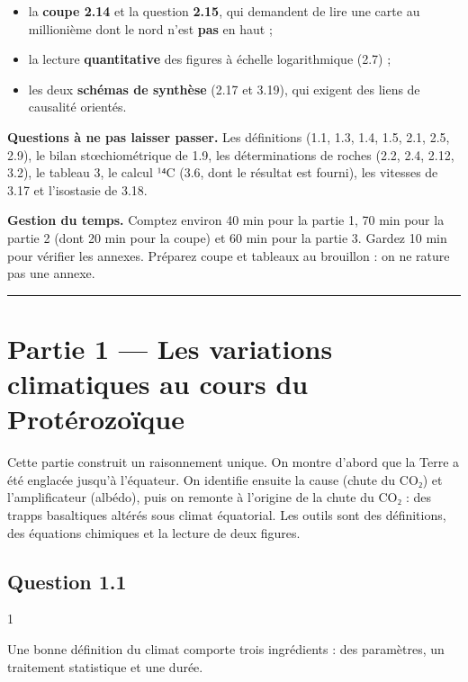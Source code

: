 \documentclass[11pt,a4paper]{article}
\providecommand{\tightlist}{\setlength{\itemsep}{0pt}\setlength{\parskip}{0pt}}
\begin{document}
\begin{itemize}
\tightlist
\item
  la \textbf{coupe 2.14} et la question \textbf{2.15}, qui demandent de lire une carte au millionième dont le nord n'est \textbf{pas} en haut ;
\item
  la lecture \textbf{quantitative} des figures à échelle logarithmique (2.7) ;
\item
  les deux \textbf{schémas de synthèse} (2.17 et 3.19), qui exigent des liens de causalité orientés.
\end{itemize}

\textbf{Questions à ne pas laisser passer.} Les définitions (1.1, 1.3, 1.4, 1.5, 2.1, 2.5, 2.9), le bilan stœchiométrique de 1.9, les déterminations de roches (2.2, 2.4, 2.12, 3.2), le tableau 3, le calcul ¹⁴C (3.6, dont le résultat est fourni), les vitesses de 3.17 et l'isostasie de 3.18.

\textbf{Gestion du temps.} Comptez environ 40 min pour la partie 1, 70 min pour la partie 2 (dont 20 min pour la coupe) et 60 min pour la partie 3. Gardez 10 min pour vérifier les annexes. Préparez coupe et tableaux au brouillon : on ne rature pas une annexe.

\begin{center}\rule{0.5\linewidth}{0.5pt}\end{center}

\hypertarget{partie-1-les-variations-climatiques-au-cours-du-protuxe9rozouxefque}{%
\section{Partie 1 --- Les variations climatiques au cours du Protérozoïque}\label{partie-1-les-variations-climatiques-au-cours-du-protuxe9rozouxefque}}

Cette partie construit un raisonnement unique. On montre d'abord que la Terre a été englacée jusqu'à l'équateur. On identifie ensuite la cause (chute du CO₂) et l'amplificateur (albédo), puis on remonte à l'origine de la chute du CO₂ : des trapps basaltiques altérés sous climat équatorial. Les outils sont des définitions, des équations chimiques et la lecture de deux figures.

\hypertarget{question-1.1}{%
\subsection{Question 1.1}\label{question-1.1}}

\begin{indication}{1}

Une bonne définition du climat comporte trois ingrédients : des paramètres, un traitement statistique et une durée.

\end{indication}
\end{document}
